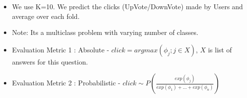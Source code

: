 \documentclass[sansserif,mathserif]{beamer}
\renewcommand{\subtitle}[1]{\vspace{6mm}{\large \bf \color{subtitlecolor} #1}}
\newcommand{\holine}{\vspace{0.3cm} \hrule height 2pt \vspace{-0.0cm}}
\begin{document}
\begin{frame}
\begin{columns}
\begin{column}{0.309\textwidth}
\begin{itemize}
    \item We use K=10. We predict the clicks (UpVote/DownVote) made by Users and average over each fold.
    \item Note: Its a multiclass problem with varying number of classes.\\ %
    \item Evaluation Metric 1 : Absolute - $click = argmax(\phi_{j};j \in X)$, $X$ is list of answers for this question.
\item Evaluation Metric 2 : Probabilistic - $click \sim P(\frac{exp(\phi_j)}{exp(\phi_1) + ... + exp(\phi_n)})$
\end{itemize}

%
\end{column}



\end{columns}



\end{frame}
\end{document}
